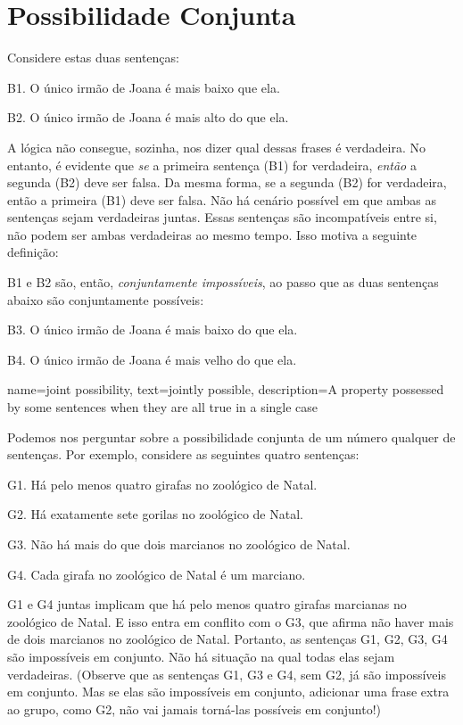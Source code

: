 \section{Possibilidade Conjunta}
Considere estas duas sentenças:
	\begin{ebullet}
		\item[B1.] O único irmão de Joana é mais baixo que ela.
		\item[B2.] O único irmão de Joana é mais alto do que ela.
	\end{ebullet}	
A lógica não consegue, sozinha, nos dizer qual dessas frases é verdadeira.
No entanto, é evidente que \emph{se} a primeira sentença (B1) for verdadeira, \emph{então} a segunda (B2) deve ser falsa.
Da mesma forma, se a segunda (B2) for verdadeira, então a primeira (B1) deve ser falsa.
Não há cenário possível em que ambas as sentenças sejam verdadeiras juntas.
Essas sentenças são incompatíveis entre si, não podem ser ambas verdadeiras ao mesmo tempo.
Isso motiva a seguinte definição:

B1 e B2 são, então, \emph{conjuntamente impossíveis}, ao passo que as duas sentenças abaixo são conjuntamente possíveis:
	\begin{ebullet}
		\item[B3.] O único irmão de Joana é mais baixo do que ela.
		\item[B4.] O único irmão de Joana é mais velho do que ela.
	\end{ebullet}

{
name=joint possibility,
text={jointly possible},
description={A property possessed by some sentences when they are all true in a single case}
}

Podemos nos perguntar sobre a possibilidade conjunta de um número qualquer de sentenças.
Por exemplo, considere as seguintes quatro sentenças:
	\begin{ebullet}	
		\item[G1.] \label{MartianGiraffes} Há pelo menos quatro girafas no zoológico de Natal.
		\item[G2.] Há exatamente sete gorilas no zoológico de Natal.
		\item[G3.] Não há mais do que dois marcianos no zoológico de Natal.
		\item[G4.] Cada girafa no zoológico de Natal é um marciano.
	\end{ebullet}
G1 e G4 juntas implicam que há pelo menos quatro girafas marcianas no zoológico de Natal.
E isso entra em conflito com o G3, que afirma não haver mais de dois marcianos no zoológico de Natal.
Portanto, as sentenças G1, G2, G3, G4 são impossíveis em conjunto.
Não há situação na qual todas elas sejam verdadeiras. 
(Observe que as sentenças G1, G3 e G4, sem G2, já são impossíveis em conjunto.
Mas se elas são impossíveis em conjunto, adicionar uma frase extra ao grupo, como G2, não vai jamais torná-las possíveis em conjunto!)

